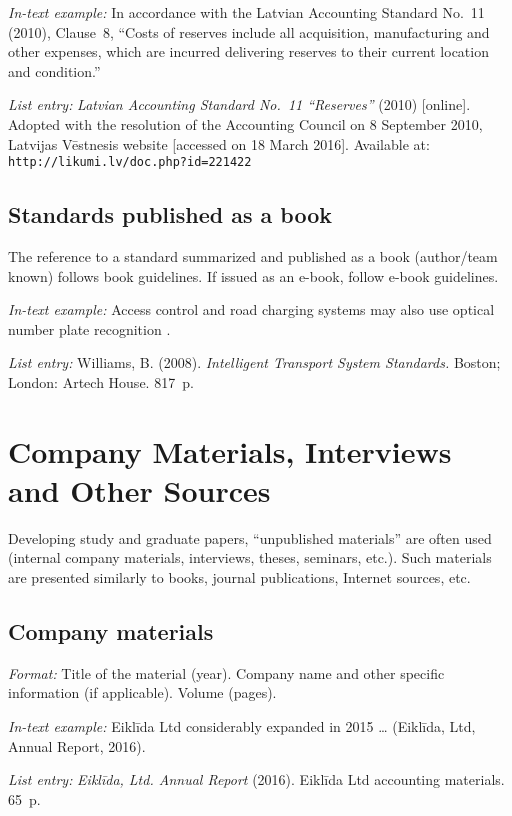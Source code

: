 \emph{In-text example:} In accordance with the Latvian Accounting Standard No.~11 (2010), Clause~8, ``Costs of reserves include all acquisition, manufacturing and other expenses, which are incurred delivering reserves to their current location and condition.''

\emph{List entry:} \emph{Latvian Accounting Standard No.~11 ``Reserves''} (2010) [online]. Adopted with the resolution of the Accounting Council on 8 September 2010, Latvijas Vēstnesis website [accessed on 18 March 2016]. Available at: \verb|http://likumi.lv/doc.php?id=221422|

\subsection*{Standards published as a book}

The reference to a standard summarized and published as a book (author/team known) follows book guidelines. If issued as an e-book, follow e-book guidelines.

\emph{In-text example:} Access control and road charging systems may also use optical number plate recognition \parencite[86]{williams2008}.

\emph{List entry:} Williams, B. (2008). \emph{Intelligent Transport System Standards.} Boston; London: Artech House. 817~p.

\section{Company Materials, Interviews and Other Sources}

Developing study and graduate papers, ``unpublished materials'' are often used (internal company materials, interviews, theses, seminars, etc.). Such materials are presented similarly to books, journal publications, Internet sources, etc.

\subsection*{Company materials}

\emph{Format:} Title of the material (year). Company name and other specific information (if applicable). Volume (pages).

\emph{In-text example:} Eiklīda Ltd considerably expanded in 2015 \dots{} (Eiklīda, Ltd, Annual Report, 2016).

\emph{List entry:} \emph{Eiklīda, Ltd. Annual Report} (2016). Eiklīda Ltd accounting materials. 65~p.

